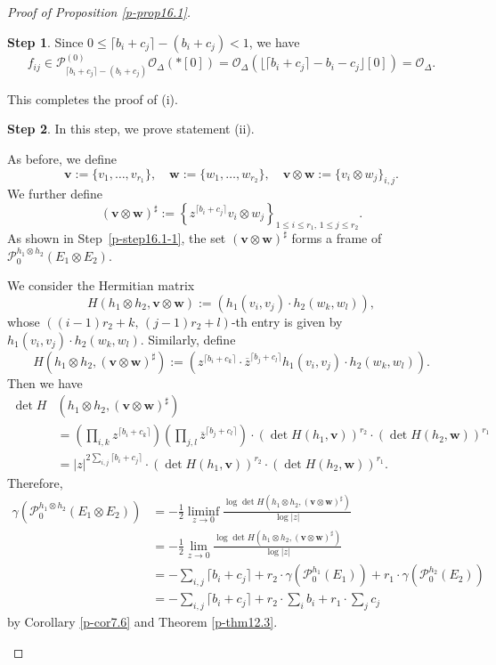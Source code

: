 \documentclass[12pt,twoside]{amsart}
\theoremstyle{definition}
\newtheorem{step}{Step}
\begin{document}
\begin{proof}[Proof of Proposition \ref{p-prop16.1}]
\begin{step}
Since \( 0 \leq \lceil b_i + c_j \rceil - (b_i + c_j) < 1 \), we have
\[
f_{ij} \in \mathcal{P}^{(0)}_{\lceil b_i + c_j \rceil - (b_i + c_j)} \mathcal{O}_\Delta(*[0]) 
= \mathcal{O}_\Delta(\lfloor \lceil b_i + c_j \rceil - b_i - c_j \rfloor [0]) 
= \mathcal{O}_\Delta.
\]

This completes the proof of (i).
\end{step}

\begin{step}\label{p-step16.1-2}
In this step, we prove statement (ii).

As before, we define
\[
\bm{v} := \{ v_1, \ldots, v_{r_1} \}, \quad 
\bm{w} := \{ w_1, \ldots, w_{r_2} \}, \quad 
\bm{v} \otimes \bm{w} := \{ v_i \otimes w_j \}_{i,j}.
\]
We further define 
\[
\left(\bm v \otimes \bm w\right)^\sharp 
:= \left\{ z^{\lceil b_i + c_j \rceil} 
v_i \otimes w_j \right\}_{1 \leq i \leq r_1, \, 1 \leq j \leq r_2}.
\]
As shown in Step~\ref{p-step16.1-1}, 
the set $\left(\bm v \otimes \bm w\right)^\sharp$ forms a frame of 
$\mathcal P^{h_1 \otimes h_2}_0(E_1 \otimes E_2)$. 

We consider the Hermitian matrix
\[
H(h_1 \otimes h_2, \bm{v} \otimes \bm{w}) 
:= \left( h_1(v_i, v_j) \cdot h_2(w_k, w_l) \right),
\]
whose $\left((i-1)r_2 + k, \, (j-1)r_2 + l\right)$-th entry is given by 
$h_1(v_i, v_j) \cdot h_2(w_k, w_l)$. Similarly, define
\[
H\left(h_1 \otimes h_2, \left(\bm{v} \otimes \bm{w}\right)^\sharp\right) 
:= \left( z^{\lceil b_i + c_k \rceil} \cdot \overline{z}^{\lceil b_j + c_l \rceil} 
h_1(v_i, v_j) \cdot h_2(w_k, w_l) \right).
\]
Then we have
\[
\begin{split}
\det H&\left(h_1 \otimes h_2, \left(\bm{v} \otimes \bm{w}\right)^\sharp\right)\\
&= \left( \prod_{i, k} z^{\lceil b_i + c_k \rceil} \right)
\left( \prod_{j, l} \overline{z}^{\lceil b_j + c_l \rceil} \right)
\cdot (\det H(h_1, \bm{v}))^{r_2} \cdot (\det H(h_2, \bm{w}))^{r_1} \\
&= |z|^{2 \sum_{i, j} \lceil b_i + c_j \rceil} 
\cdot (\det H(h_1, \bm{v}))^{r_2} \cdot (\det H(h_2, \bm{w}))^{r_1}.
\end{split}
\] 
Therefore,
\begin{equation}
\begin{split}\label{p-eq16.1}
\gamma\left( \mathcal{P}^{h_1 \otimes h_2}_0(E_1 \otimes E_2) \right) 
&= -\frac{1}{2} \liminf_{z \to 0} 
\frac{ \log \det H(h_1 \otimes h_2, \left(\bm{v} \otimes \bm{w}\right)^\sharp) }
{ \log |z| } \\
&= -\frac{1}{2} \lim_{z \to 0} 
\frac{ \log \det H(h_1 \otimes h_2, \left(\bm{v} \otimes \bm{w}\right)^\sharp) }
{ \log |z| } \\
&= -\sum_{i, j} \lceil b_i + c_j \rceil 
+ r_2 \cdot \gamma\left( \mathcal{P}^{h_1}_0(E_1) \right) 
+ r_1 \cdot \gamma\left( \mathcal{P}^{h_2}_0(E_2) \right) \\
&= -\sum_{i, j} \lceil b_i + c_j \rceil 
+ r_2 \cdot \sum_i b_i 
+ r_1 \cdot \sum_j c_j
\end{split}
\end{equation}
by Corollary \ref{p-cor7.6} and Theorem \ref{p-thm12.3}.  


\end{step}
\end{proof}
\end{document}
